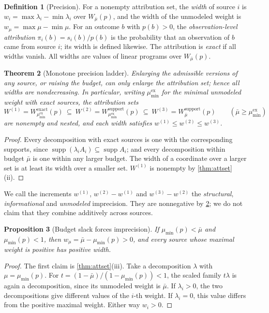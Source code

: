 \documentclass[11pt]{article}
\newtheorem{theorem}{Theorem}[section]
\newtheorem{proposition}[theorem]{Proposition}
\theoremstyle{definition}
\newtheorem{definition}[theorem]{Definition}
\theoremstyle{remark}
\newcommand{\supp}{\operatorname{supp}}
\begin{document}
\begin{definition}[Precision]\label{def:precision}
For a nonempty attribution set, the \emph{width} of source $i$ is $w_i=\max\lambda_i-\min\lambda_i$
over $W_{\bar\mu}(p)$, and the width of the unmodeled weight is $w_\mu=\max\mu-\min\mu$. For an outcome
$b$ with $p(b)>0$, the \emph{observation-level attribution} $\pi_i(b)=s_i(b)/p(b)$ is the probability
that an observation of $b$ came from source $i$; its width is defined likewise. The attribution is
\emph{exact} if all widths vanish. All widths are values of linear programs over $W_{\bar\mu}(p)$.
\end{definition}

\begin{theorem}[Monotone precision ladder]\label{thm:ladder}
Enlarging the admissible versions of any source, or raising the budget, can only enlarge the
attribution set; hence all widths are nondecreasing. In particular, writing $\mu^{\mathrm{ex}}_{\min}$
for the minimal unmodeled weight with exact sources, the attribution sets
\[
W^{(1)}=W^{\mathrm{exact}}_{\mu^{\mathrm{ex}}_{\min}}(p)\ \subseteq\
W^{(2)}=W^{\mathrm{support}}_{\mu^{\mathrm{ex}}_{\min}}(p)\ \subseteq\
W^{(3)}=W^{\mathrm{support}}_{\bar\mu}(p)\qquad(\bar\mu\ge\mu^{\mathrm{ex}}_{\min})
\]
are nonempty and nested, and each width satisfies $w^{(1)}\le w^{(2)}\le w^{(3)}$.
\end{theorem}
\begin{proof}
Every decomposition with exact sources is one with the corresponding supports, since $\supp(\lambda_i
A_i)\subseteq\supp A_i$; and every decomposition within budget $\bar\mu$ is one within any larger
budget. The width of a coordinate over a larger set is at least its width over a smaller set.
$W^{(1)}$ is nonempty by \cref{thm:attset}(ii).
\end{proof}

We call the increments $w^{(1)}$, $w^{(2)}-w^{(1)}$ and $w^{(3)}-w^{(2)}$ the \emph{structural},
\emph{informational} and \emph{unmodeled} imprecision. They are nonnegative by \cref{thm:ladder}; we do
not claim that they combine additively across sources.

\begin{proposition}[Budget slack forces imprecision]\label{prop:slack}
If $\mu_{\min}(p)<\bar\mu$ and $\mu_{\min}(p)<1$, then $w_\mu=\bar\mu-\mu_{\min}(p)>0$, and every source
whose maximal weight is positive has positive width.
\end{proposition}
\begin{proof}
The first claim is \cref{thm:attset}(iii). Take a decomposition $\lambda$ with $\mu=\mu_{\min}(p)$.
For $t=(1-\bar\mu)/(1-\mu_{\min}(p))<1$, the scaled family $t\lambda$ is again a decomposition, since its
unmodeled weight is $\bar\mu$. If $\lambda_i>0$, the two decompositions give different values of the
$i$-th weight. If $\lambda_i=0$, this value differs from the positive maximal weight. Either way
$w_i>0$.
\end{proof}
\end{document}
